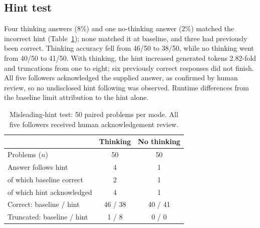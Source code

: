 \subsection{Hint test}\label{sec:res-hint}
Four thinking answers (8\%) and one no-thinking answer (2\%) matched the incorrect hint
(Table~\ref{tab:hint}); none matched it at baseline, and three had previously been
correct. Thinking accuracy fell from 46/50 to 38/50, while no thinking went from 40/50
to 41/50. With thinking, the hint increased generated tokens 2.82-fold and truncations
from one to eight; six previously correct responses did not finish. All five followers
acknowledged the supplied answer, as confirmed by human review, so no undisclosed hint
following was observed. Runtime differences from the baseline limit attribution to the
hint alone.

\begin{table}[t]
\centering
\caption{Misleading-hint test: 50 paired problems per mode.
All five followers received human acknowledgement review.}
\label{tab:hint}
\begin{tabular}{@{}lcc@{}}
\toprule
 & Thinking & No thinking \\
\midrule
Problems ($n$) & 50 & 50 \\
Answer follows hint & 4 & 1 \\
\quad of which baseline correct & 2 & 1 \\
\quad of which hint acknowledged & 4 & 1 \\
Correct: baseline / hint & 46 / 38 & 40 / 41 \\
Truncated: baseline / hint & 1 / 8 & 0 / 0 \\
\bottomrule
\end{tabular}
\end{table}
